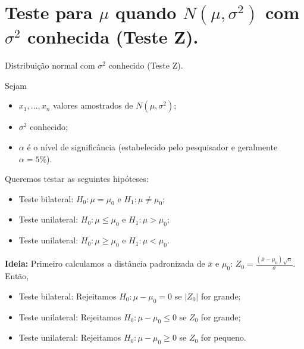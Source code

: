 \documentclass[8pt]{beamer}
\begin{document}
\section{Teste para $\mu$ quando $N(\mu, \sigma^2)$ com $\sigma^2$ conhecida (Teste Z).}

\begin{frame}{Distribuição normal com $\sigma^2$ conhecido (Teste Z).}

\large

Sejam
\begin{itemize}
	\item $x_1, \dots, x_n$ valores amostrados de $N(\mu, \sigma^2)$;
	\item $\sigma^2$ conhecido;
	\item $\alpha$ é o nível de significância (estabelecido pelo pesquisador e geralmente $\alpha=5\%$). 
\end{itemize}
\vfill

Queremos testar as seguintes hipóteses:
\begin{itemize}
	\item Teste bilateral: $H_0: \mu= \mu_0$ e $H_1: \mu \neq \mu_0$;
	\item Teste unilateral: $H_0: \mu \leq \mu_0$ e $H_1: \mu > \mu_0$;
	\item Teste unilateral: $H_0: \mu \geq \mu_0$ e $H_1: \mu < \mu_0$.
\end{itemize}
\vfill

\textbf{Ideia:} Primeiro calculamos a distância padronizada de $\bar{x}$ e $\mu_0$: $Z_0 = \frac{(\bar{x} - \mu_0) \sqrt{n}}{\sigma}$. Então, 
\begin{itemize}
	\item Teste bilateral: Rejeitamos $H_0: \mu - \mu_0 =0$ se $\lvert Z_0 \rvert$ for grande;
	\item Teste unilateral: Rejeitamos $H_0: \mu - \mu_0 \leq 0$ se $Z_0 $ for grande;
	\item Teste unilateral: Rejeitamos $H_0: \mu - \mu_0 \geq 0$ se $Z_0 $ for pequeno.
\end{itemize}


\normalsize
\end{frame}
\end{document}
